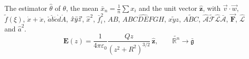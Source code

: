 \documentclass{article}
\newcommand{\vect}[1]{\mathbf{#1}}
\begin{document}
The estimator $\hat\theta$ of $\theta$, the mean $\bar{x}_n = \frac{1}{n}\sum x_i$ and the unit vector $\hat{\vect{z}}$,
with $\vec v\cdot\vec w$, $\tilde{f}(\xi)$, $\dot x + \ddot x$, $\check{a}\breve{b}\acute{c}\grave{d}\mathring{A}$, $\Hat{x}\Bar{y}\Vec{z}$,
$\hat x^2$, $\bar{f}_i^2$, $\widehat{AB}$, $\widehat{ABCDEFGH}$, $\widetilde{xyz}$, $\widetilde{ABC}$, $\hat{\mathcal{A}}\tilde{\mathcal{F}}\hat{\mathscr{L}}\bar{\mathscr{A}}$, $\mathbf{\vec F}$, $\mathcal{\hat L}$ and ${\hat a}^2$.
\begin{equation}
  \vect{E}(z) = \frac{1}{4\pi\varepsilon_0}\frac{Qz}{(z^2+R^2)^{3/2}}\,\hat{\vect{z}}, \qquad \widetilde{\mathbb{R}^n} \to \bar{\mathfrak{g}}
\end{equation}
\end{document}
